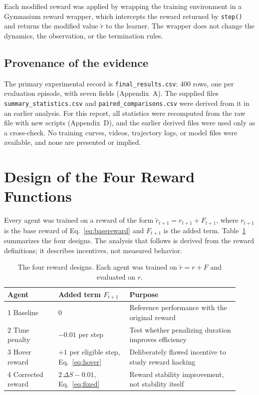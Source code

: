\documentclass[11pt,a4paper]{article}
\begin{document}
Each modified reward was applied by wrapping the training environment in a Gymnasium reward wrapper, which intercepts the reward returned by \texttt{step()} and returns the modified value $\tilde r$ to the learner. The wrapper does not change the dynamics, the observation, or the termination rules.

\subsection{Provenance of the evidence}

The primary experimental record is \texttt{final\_results.csv}: 400 rows, one per evaluation episode, with seven fields (Appendix~A). The supplied files \texttt{summary\_statistics.csv} and \texttt{paired\_comparisons.csv} were derived from it in an earlier analysis. For this report, all statistics were recomputed from the raw file with new scripts (Appendix~D), and the earlier derived files were used only as a cross-check. No training curves, videos, trajectory logs, or model files were available, and none are presented or implied.

\section{Design of the Four Reward Functions}\label{sec:rewards}

Every agent was trained on a reward of the form $\tilde r_{t+1} = r_{t+1} + F_{t+1}$, where $r_{t+1}$ is the base reward of Eq.~\eqref{eq:basereward} and $F_{t+1}$ is the added term. Table~\ref{tab:designs} summarizes the four designs. The analysis that follows is derived from the reward definitions; it describes incentives, not measured behavior.

\begin{table}[!htb]
\caption[The four reward designs]{The four reward designs. Each agent was trained on $\tilde r = r + F$ and evaluated on $r$.}\label{tab:designs}
\centering\small
\begin{tabular}{@{}p{0.2\linewidth}p{0.29\linewidth}p{0.43\linewidth}@{}}
\toprule
Agent & Added term $F_{t+1}$ & Purpose \\
\midrule
1 Baseline & $0$ & Reference performance with the original reward \\
2 Time penalty & $-0.01$ per step & Test whether penalizing duration improves efficiency \\
3 Hover reward & $+1$ per eligible step, Eq.~\eqref{eq:hover} & Deliberately flawed incentive to study reward hacking \\
4 Corrected reward & $2\,\Delta S - 0.01$, Eq.~\eqref{eq:fixed} & Reward stability improvement, not stability itself \\
\bottomrule
\end{tabular}
\end{table}
\end{document}

